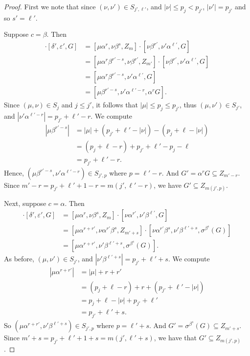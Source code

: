 \documentclass[12pt]{amsart}
\newcommand{\sse}{\subseteq}
\newcommand{\al}{\alpha}
\newcommand{\be}{\beta}
\newcommand{\de}{\delta}
\newcommand{\ep}{\varepsilon}
\newcommand{\si}{\sigma}
\theoremstyle{plain} %
\theoremstyle{definition} %
\begin{document}
\begin{proof}
First we note that since $(\nu, \nu') \in S_{j',\ell'}$, and $|\nu| \le p_j < p_{j'}$, $|\nu'| = p_{j'}$ and so $s' = \ell'$. 

Suppose $c=\be$. Then
\begin{align*}
    [\de, \ep, Z_{m}]\cdot[\de', \ep', G] &= [\mu \al^r, \nu \be^s, Z_m] \cdot [\nu \be^{r'}, \nu' \al^{\ell'}, G]\\
    &= [\mu\al^r \be^{r'-s}, \nu\be^{r'}, Z_{m'}] \cdot [\nu \be^{r'}, \nu' \al^{\ell'}, G]\\
    &= [\mu\al^r \be^{r'-s}, \nu'\al^{\ell'}, G]\\
    &= [\mu\be^{r'-s}, \nu' \al^{\ell'-r}, \al^rG].
\end{align*}
Since $(\mu, \nu) \in S_j$ and $j \leq j'$, it follows that $|\mu| \leq p_j \leq p_{j'}$, thus $(\mu, \nu') \in S_{j'}$, and $|\nu' \al^{\ell' - r}| = p_{j'}+\ell' - r$.
We compute
\begin{align*}
    |\mu\be^{r'-s}| &= |\mu| + (p_{j'} + \ell' - |\nu|) - (p_j + \ell - |\nu|)\\
    &= (p_j + \ell - r) + p_{j'} + \ell' - p_j - \ell\\
    &= p_{j'} + \ell' - r.
\end{align*}
Hence, $(\mu\be^{r'-s}, \nu' \al^{\ell'-r}) \in S_{j', p}$ where $p = \ell'-r$. And $G' = \al^r G \sse Z_{m'-r}$. Since $m' - r = p_{j'} + \ell' + 1-r = m(j', \ell'-r)$, we have $G' \sse Z_{m(j',p)}$.

Next, suppose $c =\al$. Then
\begin{align*}
    [\de, \ep, Z_{m}]\cdot[\de', \ep', G] &= [\mu\al^r, \nu\be^s, Z_m] \cdot[\nu \al^{r'}, \nu'\be^{\ell'}, G]\\
    &= [\mu\al^{r+r'}, \nu\al^{r'} \be^s, Z_{m'+s}] \cdot [\nu\al^{r'}\be^s, \nu' \be^{\ell'+s}, \si^{\be^s}(G)]\\
    &= [\mu\al^{r+r'}, \nu'\be^{\ell'+s}, \si^{\be^s}(G)].
\end{align*}
As before, $(\mu, \nu') \in S_{j'}$, and $|\nu'\be^{\ell'+s}| = p_{j'} + \ell' + s$. We compute
\begin{align*}
    |\mu\al^{r+r'}| &= |\mu| + r + r'\\
    &= (p_j + \ell -r) + r + (p_{j'}+\ell' - |\nu|)\\
    &= p_j + \ell - |\nu| + p_{j'} +\ell'\\
    &= p_{j'} +  \ell' + s.
\end{align*}
So $(\mu\al^{r+r'}, \nu'\be^{\ell'+s}) \in S_{j', p}$ where $p= \ell'+s$. And $G' = \si^{\be^s}(G) \sse Z_{m'+s}$. Since $m'+s = p_{j'}+\ell' + 1 + s = m(j', \ell'+s)$, we have that $G' \sse Z_{m(j',p)}$.
\end{proof}
\end{document}
